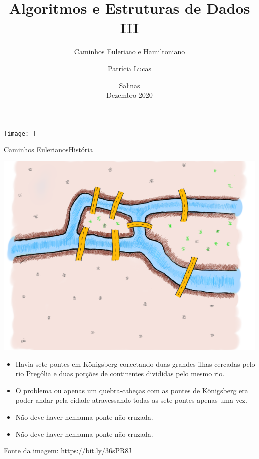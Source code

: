 \documentclass[t]{beamer}
\title[]{Algoritmos e Estruturas de Dados III}
\subtitle[]{Caminhos Euleriano e Hamiltoniano}
\author[]{Patrícia Lucas\\{\footnotesize }}
\institute{Bacharelado em Sistemas de Informação \\ IFNMG  - Campus Salinas}
\date{\scriptsize Salinas\\Dezembro 2020}
\begin{document}
\begin{frame}

\begin{center}
\texttt{[image: ]}
\end{center}
  \titlepage
\end{frame}



\begin{ftst}{Caminhos Eulerianos}{História}
\vone
\vone
\begin{minipage}{.5\textwidth}
    \centering
    \justifying
    \includegraphics[scale=0.23]{Figuras/euleriano_1.png}
\end{minipage}%
\hfill
\begin{minipage}{.5\textwidth}
    \footnotesize
    \justifying
    \begin{itemize}
        \item Havia sete pontes em Königsberg conectando duas grandes ilhas cercadas pelo rio Prególia e duas porções de continentes divididas pelo mesmo rio.
        \item O problema ou apenas um quebra-cabeças com as pontes de Königsberg era poder andar pela cidade atravessando todas as sete pontes apenas uma vez. 
        \item Não deve haver nenhuma ponte não cruzada.
        \item Não deve haver nenhuma ponte não cruzada.
    \end{itemize}
\end{minipage}%
\vone
\vone
\tiny
Fonte da imagem: \hypertarget{clique aqui.}{https://bit.ly/36sPR8J}
\end{ftst}
\end{document}
